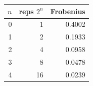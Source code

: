 \begin{tabular}{r r r}
\toprule
$n$ & reps $2^n$ & Frobenius \\
\midrule
0 & 1 & 0.4002 \\
1 & 2 & 0.1933 \\
2 & 4 & 0.0958 \\
3 & 8 & 0.0478 \\
4 & 16 & 0.0239 \\
\bottomrule
\end{tabular}
